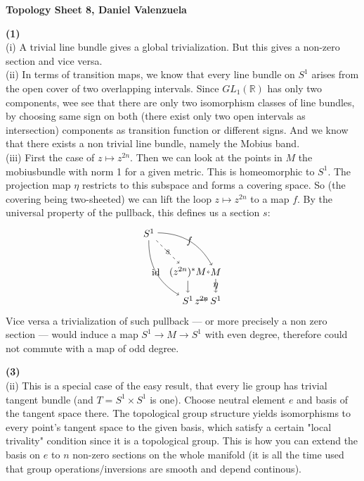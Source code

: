 \documentclass{scrartcl}
\begin{document}
\small
\textbf{Topology Sheet 8, Daniel Valenzuela}

\textbf{(1)}\\
(i) A trivial line bundle gives a global trivialization. But this  gives a non-zero section and vice versa.\\
(ii) In terms of transition maps, we know that every line bundle on $S^1$ arises from the open cover of two overlapping intervals. Since $GL_1(\mathbb{R})$ has only two components, wee see that there are only two isomorphism classes of line bundles, by choosing same sign on both (there exist only two open intervals as intersection) components as transition function or different signs. And we know that there exists a non trivial line bundle, namely the Mobius band.\\
(iii) First the case of $z\mapsto z^{2n}$. Then we can look at the points in $M$ the mobiusbundle with norm 1 for a given metric. This is homeomorphic to $S^1$. The projection map $\eta$ restricts to this subspace and forms a covering space. So (the covering being two-sheeted) we can lift the loop $z\mapsto z^{2n}$ to a map $f$. By the universal property of the pullback, this defines us a section $s$:\\
\[\begin{tikzpicture}
  \node (P) {$(z^{2n})^*M$};
  \node (B) [right of=P] {$M$};
  \node (A) [below of=P] {$S^1$};
  \node (C) [below of=B] {$S^1$};
  \node (P1) [node distance=1.4cm, left of=P, above of=P] {$S^1$};
  \draw[->] (P) to node {} (B);
  \draw[->] (P) to node [swap] {} (A);
  \draw[->] (A) to node [swap] {$z^{2n}$} (C);
  \draw[->] (B) to node {$\eta$} (C);
  \draw[->, bend right] (P1) to node [swap] {id} (A);
  \draw[->, bend left] (P1) to node {$f$} (B);
  \draw[->, dashed] (P1) to node {$s$} (P);
\end{tikzpicture}
\]
Vice versa a trivialization of such pullback --- or more precisely a non zero section --- would induce a map $S^1\to M \to S^1$ with even degree, therefore could not commute with a map of odd degree.

\textbf{(3)}\\
(ii) This is a special case of the easy result, that every lie group has trivial tangent bundle (and $T=S^1\times S^1$ is one). Choose neutral element $e$ and basis of the tangent space there. The topological group structure yields isomorphisms to every point's tangent space to the given basis, which satisfy a certain "local trivality" condition since it is a topological group. This is how you can extend the basis on $e$ to $n$ non-zero sections on the whole manifold (it is all the time used that group operations/inversions are smooth and depend continous).
\end{document}
